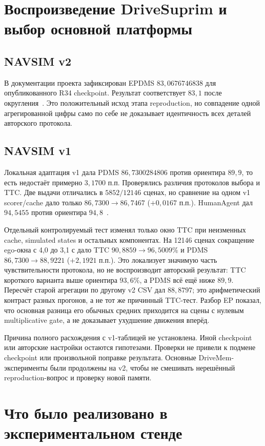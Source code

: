 \documentclass[11pt,a4paper]{article}
\begin{document}
\section{Воспроизведение DriveSuprim и выбор основной платформы}
\subsection{NAVSIM v2}
В документации проекта зафиксирован EPDMS $83{,}0676746838$ для опубликованного R34 checkpoint. Результат соответствует $83{,}1$ после округления~\cite{repro}. Это положительный исход этапа reproduction, но совпадение одной агрегированной цифры само по себе не доказывает идентичность всех деталей авторского протокола.

\subsection{NAVSIM v1}
Локальная адаптация v1 дала PDMS $86{,}7300284806$ против ориентира $89{,}9$, то есть недостаёт примерно $3{,}1700$ п.п. Проверялись различия протоколов выбора и TTC. Две выдачи отличались в $5852/12146$ сценах, но сравнение на одном v1 scorer/cache дало только $86{,}7300\rightarrow86{,}7467$ ($+0{,}0167$ п.п.). HumanAgent дал $94{,}5455$ против ориентира $94{,}8$~\cite{repro}.

Отдельный контролируемый тест изменял только окно TTC при неизменных cache, simulated states и остальных компонентах. На 12146 сценах сокращение ego-окна с 4,0 до 3,1 с дало TTC $90{,}8859\rightarrow96{,}5009\%$ и PDMS $86{,}7300\rightarrow88{,}9221$ ($+2{,}1921$ п.п.). Это локализует значимую часть чувствительности протокола, но не воспроизводит авторский результат: TTC короткого варианта выше ориентира $93{,}6\%$, а PDMS всё ещё ниже $89{,}9$. Пересчёт старой агрегации по другому v2 CSV дал $88{,}8797$; это арифметический контраст разных прогонов, а не тот же причинный TTC-тест. Разбор EP показал, что основная разница его обычных средних приходится на сцены с нулевым multiplicative gate, а не доказывает ухудшение движения вперёд.\par

Причина полного расхождения с v1-таблицей не установлена. Иной checkpoint или авторские настройки остаются гипотезами. Проверки не привели к подмене checkpoint или произвольной поправке результата. Основные DriveMem-эксперименты были продолжены на v2, чтобы не смешивать нерешённый reproduction-вопрос и проверку новой памяти.

\section{Что было реализовано в экспериментальном стенде}
\end{document}
